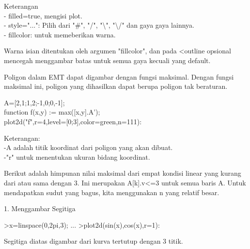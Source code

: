 \documentclass[a4paper,10pt]{article}
\begin{document}
\begin{eulernotebook}
\begin{eulercomment}
\begin{eulercomment}
\begin{eulercomment}
\begin{eulercomment}
\begin{eulercomment}
\begin{eulercomment}
\begin{eulercomment}
\begin{eulercomment}
\begin{eulercomment}
Keterangan\\
- filled=true, mengisi plot.\\
- style="...": Pilih dari "#", "/", "\textbackslash{}", "\textbackslash{}/" dan gaya gaya lainnya.\\
- fillcolor: untuk memeberikan warna.

Warna isian ditentukan oleh argumen "fillcolor", dan pada \textless{}outline
opsional mencegah menggambar batas untuk semua gaya kecuali yang
default.

Poligon dalam EMT dapat digambar dengan fungsi maksimal. Dengan fungsi
maksimal ini, poligon yang dihasilkan dapat berupa poligon tak
beraturan.

A=[2,1;1,2;-1,0;0,-1];\\
function f(x,y) := max([x,y].A');\\
plot2d("f",r=4,level=[0;3],color=green,n=111):

Keterangan:\\
-A adalah titik koordinat dari poligon yang akan dibuat.\\
-"r" untuk menentukan ukuran bidang koordinat.

Berikut adalah himpunan nilai maksimal dari empat kondisi linear yang
kurang dari atau sama dengan 3. Ini merupakan A[k].v\textless{}=3 untuk semua
baris A. Untuk mendapatkan sudut yang bagus, kita menggunakan n yang
relatif besar.


1. Menggambar Segitiga
\end{eulercomment}
\begin{eulerprompt}
>x=linspace(0,2pi,3); ...
>plot2d(sin(x),cos(x),r=1):
\end{eulerprompt}
\begin{eulercomment}
Segitiga diatas digambar dari kurva tertutup dengan 3 titik.


\end{eulercomment}
\end{eulercomment}
\end{eulercomment}
\end{eulercomment}
\end{eulercomment}
\end{eulercomment}
\end{eulercomment}
\end{eulercomment}
\end{eulercomment}
\end{eulernotebook}
\end{document}
